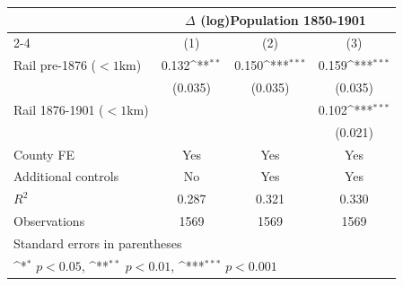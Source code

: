 {
\def\sym#1{\ifmmode^{#1}\else\(^{#1}\)\fi}
\begin{tabular}{l*{3}{c}}
\toprule
                &\multicolumn{3}{c}{$\Delta$ (log)Population 1850-1901}  \\\cmidrule(lr){2-4}
                &\multicolumn{1}{c}{(1)}         &\multicolumn{1}{c}{(2)}         &\multicolumn{1}{c}{(3)}         \\
\midrule
Rail pre-1876 ($<1$km)&    0.132\sym{**} &    0.150\sym{***}&    0.159\sym{***}\\
                &  (0.035)         &  (0.035)         &  (0.035)         \\
Rail 1876-1901 ($<1$km)&                  &                  &    0.102\sym{***}\\
                &                  &                  &  (0.021)         \\
County FE       &      Yes         &      Yes         &      Yes         \\
Additional controls &       No         &      Yes         &      Yes         \\
\midrule
\(R^{2}\)       &    0.287         &    0.321         &    0.330         \\
Observations    &     1569         &     1569         &     1569         \\
\bottomrule
\multicolumn{4}{l}{\footnotesize Standard errors in parentheses}\\
\multicolumn{4}{l}{\footnotesize \sym{*} \(p<0.05\), \sym{**} \(p<0.01\), \sym{***} \(p<0.001\)}\\
\end{tabular}
}
